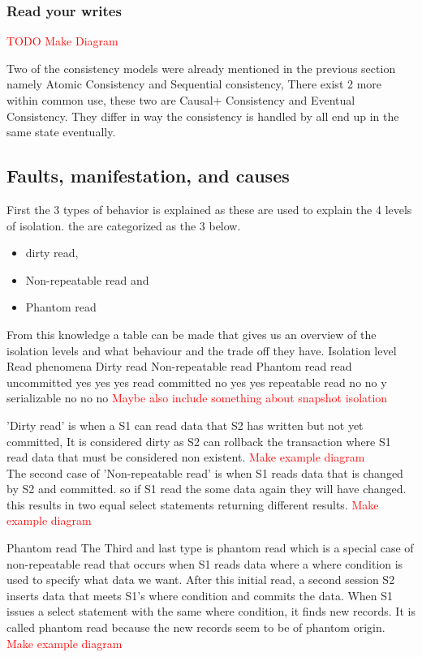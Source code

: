 \documentclass[a4paper,10pt,titlepage]{report}
\begin{document}
\subsubsection{Read your writes}
\textcolor{red}{TODO Make Diagram}

Two of the consistency models were already mentioned in the previous section namely Atomic Consistency and Sequential consistency, There exist 2 more within common use, these two are Causal+ Consistency and  Eventual Consistency. They differ in way the consistency is handled by all end up in the same state eventually.






\subsection{Faults, manifestation, and causes}


First the 3 types of behavior is explained as these are used to explain the 4 levels of isolation. the are categorized as the 3 below.
\begin{itemize}
\item dirty read,
\item Non-repeatable read and
\item Phantom read
\end{itemize}

From this knowledge a table can be made that gives us an overview of the isolation levels and what behaviour and the trade off they have.
Isolation level	Read phenomena
Dirty read	Non-repeatable read	Phantom read
read uncommitted	yes	yes	yes
read committed	no	yes	yes
repeatable read	no	no	y
serializable	no	no	no
\textcolor{red}{Maybe also include something about snapshot isolation}



'Dirty read' is when a S1 can read data that S2 has written but not yet committed, It is considered dirty as S2 can rollback the transaction where S1 read data that must be considered non existent. \textcolor{red}{Make example diagram}
\\
The second case of 'Non-repeatable read' is when S1 reads data that is changed by S2 and committed. so if S1 read the some data again they will have changed. this results in two equal select statements returning different results.  \textcolor{red}{Make example diagram}

Phantom read
The Third and last type is phantom read which is a special case of non-repeatable read that occurs when S1 reads data where a where condition is used to specify what data we want. After this initial read, a second session S2 inserts data that meets S1's where condition and commits the data. When S1 issues a select statement with the same where condition, it finds new records. It is called phantom read because the new records seem to be of phantom origin.
 \textcolor{red}{Make example diagram}
\end{document}
